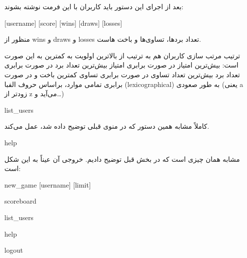 \documentclass[]{article}
\begin{document}
 بعد از اجرای این دستور باید کاربران با این فرمت نوشته بشوند:

\begin{tcolorbox}[boxrule=0pt]
	\begin{latin}
  	  \large{
  	  	[username] [score] [wins] [draws] [losses]
		}
	\end{latin}
\end{tcolorbox}



منظور از wins و draws و losses تعداد بردها، تساوی‌ها و باخت هاست.

ترتیب مرتب سازی کاربران هم به ترتیب از بالاترین اولویت به کمترین به این صورت است: بیش‌ترین امتیاز \- در صورت برابری امتیاز بیش‌ترین تعداد برد \- در صورت برابری تعداد برد بیش‌ترین تعداد تساوی \- در صورت برابری تساوی کمترین باخت و در صورت برابری تمامی موارد، براساس حروف الفبا (lexicographical) به طور صعودی (یعنی a زودتر از z می‌آید و…)


\hrulefill





\begin{tcolorbox}[boxrule=0pt]
	\begin{latin}
  	  \large{
  	  	list\_users
		}
	\end{latin}
\end{tcolorbox}

کاملاً مشابه همین دستور که در منوی قبلی توضیح داده شد، عمل می‌کند.

\hrulefill


\begin{tcolorbox}[boxrule=0pt]
	\begin{latin}
  	  \large{
  	  	help
		}
	\end{latin}
\end{tcolorbox}

مشابه همان چیزی است که در بخش قبل توضیح دادیم. خروجی آن عیناً به این شکل است:



\begin{tcolorbox}[boxrule=0pt]
	\begin{latin}
  	  \large{

  	  	new\_game [username] [limit]

scoreboard

list\_users

help

logout
		}
	\end{latin}
\end{tcolorbox}
\end{document}
